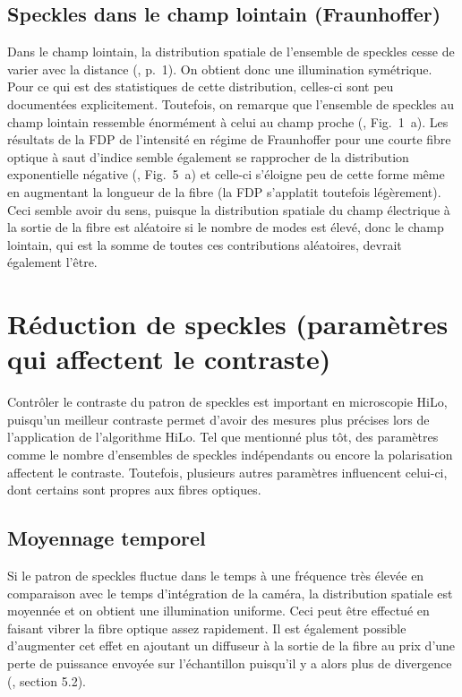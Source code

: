 \documentclass{article}       %
\begin{document}
\subsection{Speckles dans le champ lointain (Fraunhoffer)}

Dans le champ lointain, la distribution spatiale de l'ensemble de speckles cesse de varier avec la distance (\cite{Commerce}, p.~1). On obtient donc une illumination symétrique. Pour ce qui est des statistiques de cette distribution, celles-ci sont peu documentées explicitement. Toutefois, on remarque que l'ensemble de speckles au champ lointain ressemble énormément à celui au champ proche (\cite{FiberStats}, Fig.~1~a). Les résultats de la FDP de l'intensité en régime de Fraunhoffer pour une courte fibre optique à saut d'indice semble également se rapprocher de la distribution exponentielle négative (\cite{FiberStats}, Fig.~5~a) et celle-ci s'éloigne peu de cette forme même en augmentant la longueur de la fibre (la FDP s'applatit toutefois légèrement). Ceci semble avoir du sens, puisque la distribution spatiale du champ électrique à la sortie de la fibre est aléatoire si le nombre de modes est élevé, donc le champ lointain, qui est la somme de toutes ces contributions aléatoires, devrait également l'être.\\

\bigskip

\section{Réduction de speckles (paramètres qui affectent le contraste)}
\label{Sec:Reduction}

Contrôler le contraste du patron de speckles est important en microscopie HiLo, puisqu'un meilleur contraste permet d'avoir des mesures plus précises lors de l'application de l'algorithme HiLo. Tel que mentionné plus tôt, des paramètres comme le nombre d'ensembles de speckles indépendants ou encore la polarisation affectent le contraste. Toutefois, plusieurs autres paramètres influencent celui-ci, dont certains sont propres aux fibres optiques.

\subsection{Moyennage temporel}

Si le patron de speckles fluctue dans le temps à une fréquence très élevée en comparaison avec le temps d'intégration de la caméra, la distribution spatiale est moyennée et on obtient une illumination uniforme. Ceci peut être effectué en faisant vibrer la fibre optique assez rapidement. Il est également possible d'augmenter cet effet en ajoutant un diffuseur à la sortie de la fibre au prix d'une perte de puissance envoyée sur l'échantillon puisqu'il y a alors plus de divergence (\cite{Manuel}, section 5.2).
\end{document}
